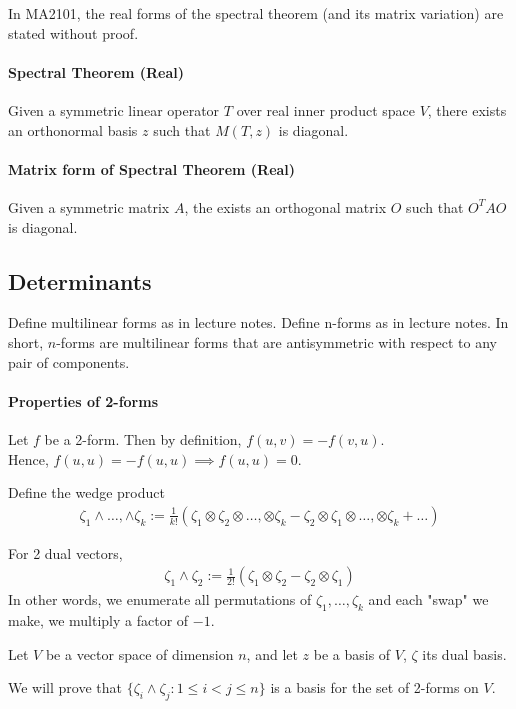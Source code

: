 \documentclass{article}
\begin{document}
In MA2101, the real forms of the spectral theorem (and its matrix variation) are stated without proof.

\paragraph{Spectral Theorem (Real)} Given a symmetric linear operator $T$ over real inner product space $V$, there exists an orthonormal basis $z$ such that $M(T,z)$ is diagonal.

\paragraph{Matrix form of Spectral Theorem (Real)} Given a symmetric matrix $A$, the exists an orthogonal matrix $O$ such that $O^TAO$ is diagonal.


\subsection{Determinants}
Define multilinear forms as in lecture notes.
Define n-forms as in lecture notes. In short, $n$-forms are multilinear forms that are antisymmetric with respect to any pair of components.

\paragraph{Properties of 2-forms}
Let $f$ be a 2-form. Then by definition, $f(u,v)=-f(v,u)$.\\
Hence, $f(u,u) = -f(u,u)\implies f(u,u)=0$.

Define the wedge product 
\begin{align*}
\zeta_1\wedge \dots, \wedge \zeta_k := \frac{1}{k!}(\zeta_1\otimes \zeta_2\otimes \dots, \otimes \zeta_k - \zeta_2\otimes \zeta_1\otimes \dots, \otimes \zeta_k + \dots)
\end{align*}

For 2 dual vectors, 
\begin{align*}
\zeta_1\wedge \zeta_2 := \frac{1}{2!}(\zeta_1\otimes \zeta_2 - \zeta_2 \otimes \zeta_1)
\end{align*}
In other words, we enumerate all permutations of $\zeta_1, \dots, \zeta_k$ and each "swap" we make, we multiply a factor of $-1$.

Let $V$ be a vector space of dimension $n$, and let $z$ be a basis of $V$, $\zeta$ its dual basis.

We will prove that $\{\zeta_i \wedge \zeta_j : 1\leq i < j \leq n\}$ is a basis for the set of 2-forms on $V$.
\end{document}
